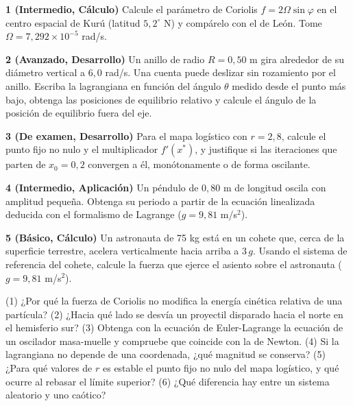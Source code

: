 \documentclass[10pt,openany]{book}
\begin{document}
\begin{tcolorbox}[title={Ejercicios propuestos}, studiumworked, breakable]

\noindent\textbf{1 (Intermedio, Cálculo)}
Calcule el parámetro de Coriolis \(f = 2\Omega\sin\varphi\) en el centro espacial de Kurú (latitud \(5{,}2^\circ\) N) y compárelo con el de León. Tome \(\Omega = 7{,}292\times 10^{-5}\) rad/s.

\noindent\textbf{2 (Avanzado, Desarrollo)}
Un anillo de radio \(R = 0{,}50\) m gira alrededor de su diámetro vertical a \(6{,}0\) rad/s. Una cuenta puede deslizar sin rozamiento por el anillo. Escriba la lagrangiana en función del ángulo \(\theta\) medido desde el punto más bajo, obtenga las posiciones de equilibrio relativo y calcule el ángulo de la posición de equilibrio fuera del eje.

\noindent\textbf{3 (De examen, Desarrollo)}
Para el mapa logístico con \(r = 2{,}8\), calcule el punto fijo no nulo y el multiplicador \(f'(x^{*})\), y justifique si las iteraciones que parten de \(x_0 = 0{,}2\) convergen a él, monótonamente o de forma oscilante.

\noindent\textbf{4 (Intermedio, Aplicación)}
Un péndulo de \(0{,}80\) m de longitud oscila con amplitud pequeña. Obtenga su periodo a partir de la ecuación linealizada deducida con el formalismo de Lagrange (\(g = 9{,}81\) m/s\(^2\)).

\noindent\textbf{5 (Básico, Cálculo)}
Un astronauta de 75 kg está en un cohete que, cerca de la superficie terrestre, acelera verticalmente hacia arriba a \(3\,g\). Usando el sistema de referencia del cohete, calcule la fuerza que ejerce el asiento sobre el astronauta (\(g = 9{,}81\) m/s\(^2\)).
\end{tcolorbox}

\begin{tcolorbox}[title={Autoevaluación}, studiumcheck, breakable]

(1) ¿Por qué la fuerza de Coriolis no modifica la energía cinética relativa de una partícula? (2) ¿Hacia qué lado se desvía un proyectil disparado hacia el norte en el hemisferio sur? (3) Obtenga con la ecuación de Euler-Lagrange la ecuación de un oscilador masa-muelle y compruebe que coincide con la de Newton. (4) Si la lagrangiana no depende de una coordenada, ¿qué magnitud se conserva? (5) ¿Para qué valores de \(r\) es estable el punto fijo no nulo del mapa logístico, y qué ocurre al rebasar el límite superior? (6) ¿Qué diferencia hay entre un sistema aleatorio y uno caótico?
\end{tcolorbox}
\studiumchaptercheck
\end{document}

